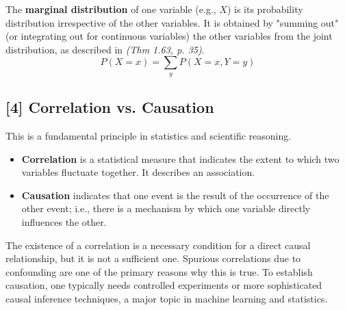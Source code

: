 \documentclass[11pt,a4paper]{article}
\newcommand{\scriptcite}[2]{\textit{(#1, p. #2)}}
\begin{document}
The \textbf{marginal distribution} of one variable (e.g., $X$) is its probability distribution irrespective of the other variables. It is obtained by "summing out" (or integrating out for continuous variables) the other variables from the joint distribution, as described in \scriptcite{Thm 1.63}{35}.
\[ P(X=x) = \sum_y P(X=x, Y=y) \]

\hypertarget{note4}{}\subsection*{[4] Correlation vs. Causation}
This is a fundamental principle in statistics and scientific reasoning.
\begin{itemize}
    \item \textbf{Correlation} is a statistical measure that indicates the extent to which two variables fluctuate together. It describes an association.
    \item \textbf{Causation} indicates that one event is the result of the occurrence of the other event; i.e., there is a mechanism by which one variable directly influences the other.
\end{itemize}
The existence of a correlation is a necessary condition for a direct causal relationship, but it is not a sufficient one. Spurious correlations due to confounding are one of the primary reasons why this is true. To establish causation, one typically needs controlled experiments or more sophisticated causal inference techniques, a major topic in machine learning and statistics.
\end{document}

